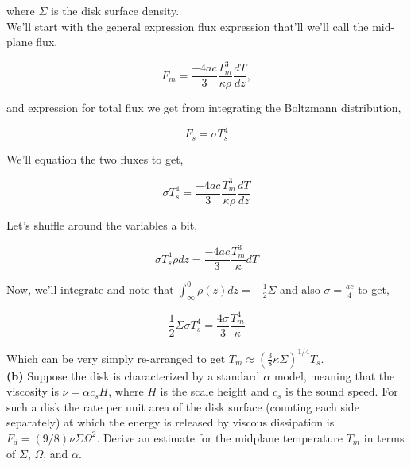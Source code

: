\documentclass[12pt]{article}
\begin{document}
\noindent where $\Sigma$ is the disk surface density. \\


\noindent We'll start with the general expression flux expression that'll we'll call the mid-plane flux,

\begin{equation}
F_m = \frac{-4ac}{3}\frac{T_m^3}{\kappa \rho} \frac{dT}{dz},
\end{equation}

\noindent and expression for total flux we get from integrating the Boltzmann distribution,

\begin{equation}
F_s = \sigma T_s^4
\end{equation}

\noindent We'll equation the two fluxes to get,

\begin{equation}
\sigma T_s^4 = \frac{-4ac}{3}\frac{T_m^3}{\kappa \rho} \frac{dT}{dz}
\end{equation}

\noindent Let's shuffle around the variables a bit,

\begin{equation}
\sigma T_s^4 \rho dz = \frac{-4ac}{3}\frac{T_m^3}{\kappa} dT
\end{equation}

\noindent Now, we'll integrate and note that $\int_\infty^0 \rho\left(z\right) dz = -\frac{1}{2}\Sigma$ and also $\sigma = \frac{ac}{4}$ to get,

\begin{equation}
\frac{1}{2}\Sigma \sigma T_s^4 = \frac{4\sigma}{3}\frac{T_m^4}{\kappa}
\end{equation}

\noindent Which can be very simply re-arranged to get $T_m \approx \left( \frac{3}{8} \kappa \Sigma \right)^{1/4} T_s$. \\

\noindent \textbf{(b)} Suppose the disk is characterized by a standard $\alpha$ model, meaning that the viscosity is $\nu = \alpha c_s H$, where $H$ is the scale height and $c_s$ is the sound speed. For such a disk the rate per unit area of the disk surface (counting each side separately) at which the energy is released by viscous dissipation is $F_d = \left( 9/8 \right)\nu\Sigma\Omega^2$. Derive an estimate for the midplane temperature $T_m$ in terms of $\Sigma$, $\Omega$, and $\alpha$. \\
\end{document}
